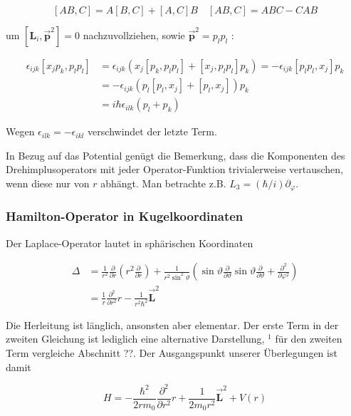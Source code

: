 \documentclass[10pt, letterpaper]{article}
\begin{document}
$$
[A B, C]=A[B, C]+[A, C] B \quad[A B, C]=A B C-C A B
$$

um $\left[\mathbf{L}_{i}, \overrightarrow{\mathbf{p}}^{2}\right]=0$ nachzuvollziehen, sowie $\overrightarrow{\mathbf{p}}^{2}=p_{l} p_{l}$ :

$$
\begin{aligned}
\epsilon_{i j k}\left[x_{j} p_{k}, p_{l} p_{l}\right] & =\epsilon_{i j k}\left(x_{j}\left[p_{k}, p_{l} p_{l}\right]+\left[x_{j}, p_{l} p_{l}\right] p_{k}\right)=-\epsilon_{i j k}\left[p_{l} p_{l}, x_{j}\right] p_{k} \\
& =-\epsilon_{i j k}\left(p_{l}\left[p_{l}, x_{j}\right]+\left[p_{l}, x_{j}\right]\right) p_{k} \\
& =i \hbar \epsilon_{i l k}\left(p_{l}+p_{k}\right)
\end{aligned}
$$

Wegen $\epsilon_{i l k}=-\epsilon_{i k l}$ verschwindet der letzte Term.

In Bezug auf das Potential genügt die Bemerkung, dass die Komponenten des Drehimplusoperators mit jeder Operator-Funktion trivialerweise vertauschen, wenn diese nur von $r$ abhängt. Man betrachte z.B. $L_{3}=(\hbar / i) \partial_{\varphi}$.

\subsubsection*{Hamilton-Operator in Kugelkoordinaten}
Der Laplace-Operator lautet in sphärischen Koordinaten

$$
\begin{aligned}
\Delta & =\frac{1}{r^{2}} \frac{\partial}{\partial r}\left(r^{2} \frac{\partial}{\partial r}\right)+\frac{1}{r^{2} \sin ^{2} \vartheta}\left(\sin \vartheta \frac{\partial}{\partial \vartheta} \sin \vartheta \frac{\partial}{\partial \vartheta}+\frac{\partial^{2}}{\partial \varphi^{2}}\right) \\
& =\frac{1}{r} \frac{\partial^{2}}{\partial r^{2}} r-\frac{1}{r^{2} \hbar^{2}} \overrightarrow{\mathbf{L}}^{2}
\end{aligned}
$$

Die Herleitung ist länglich, ansonsten aber elementar. Der erste Term in der zweiten Gleichung ist lediglich eine alternative Darstellung, ${ }^{1}$ für den zweiten Term vergleiche Abschnitt ??. Der Ausgangspunkt unserer Überlegungen ist damit

$$
H=-\frac{\hbar^{2}}{2 r m_{0}} \frac{\partial^{2}}{\partial r^{2}} r+\frac{1}{2 m_{0} r^{2}} \overrightarrow{\mathbf{L}}^{2}+V(r)
$$
\end{document}
